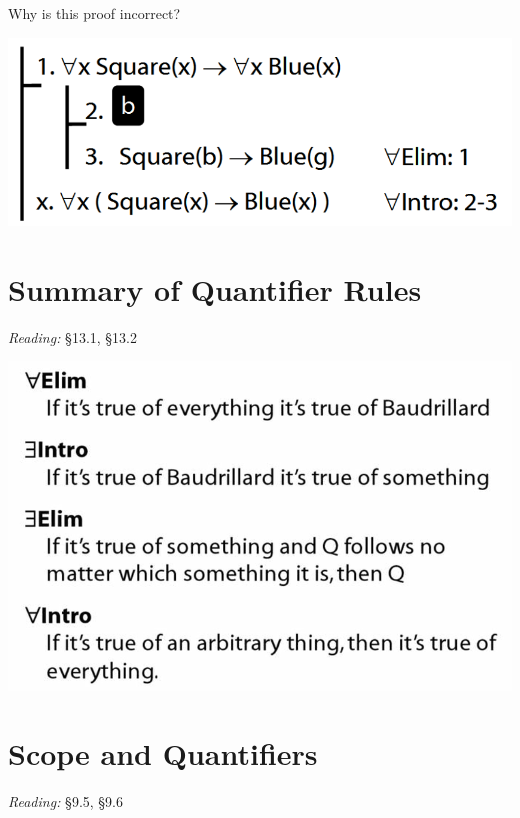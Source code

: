 \documentclass[12pt]{extarticle}
\begin{document}
\begin{multicols*}{3}
\begin{minipage}{\columnwidth}
 
Why is this proof incorrect?
 
\begin{center}
\includegraphics[scale=0.3]{img/proof_universal_intro_incorrect.png}
\end{center}
\end{minipage}
 
 
 
\section{Summary of Quantifier Rules}
 
\emph{Reading:} §13.1, §13.2
 
\begin{center}
\includegraphics[scale=0.3]{img/quantifier_rule_summary.png}
\end{center}
 
\columnbreak 
\section{Scope and Quantifiers}
 
\emph{Reading:} §9.5, §9.6
 

\end{multicols*}
\end{document}
